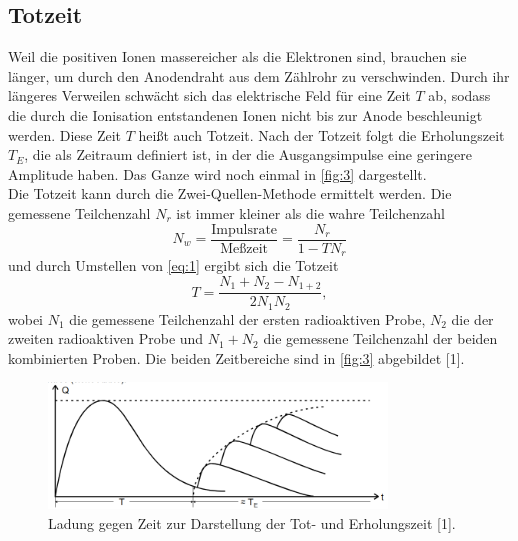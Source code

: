 \subsection{Totzeit}
Weil die positiven Ionen massereicher als die Elektronen sind, brauchen sie länger, um durch den Anodendraht aus dem Zählrohr zu verschwinden. Durch ihr längeres Verweilen schwächt sich das elektrische Feld für eine Zeit $T$ ab, sodass die durch die Ionisation entstandenen Ionen nicht bis zur Anode beschleunigt werden. Diese Zeit $T$ heißt auch Totzeit. Nach der Totzeit folgt die Erholungszeit $T_E$, die als Zeitraum definiert ist, in der die Ausgangsimpulse eine geringere Amplitude haben. Das Ganze wird noch einmal in \autoref{fig:3} dargestellt.\\
Die Totzeit kann durch die Zwei-Quellen-Methode ermittelt werden. Die gemessene Teilchenzahl $N_r$ ist immer kleiner als die wahre Teilchenzahl
\begin{equation}
  N_w=\frac{\textrm{Impulsrate}}{\textrm{Meßzeit}}=\frac{N_r}{1-TN_r}
  \label{eq:1}
\end{equation}
und durch Umstellen von \eqref{eq:1} ergibt sich die Totzeit
\begin{equation}
  T=\frac{N_1+N_2-N_{1+2}}{2N_{1}N_{2}},
  \label{eq:2}
\end{equation}
wobei $N_1$ die gemessene Teilchenzahl der ersten radioaktiven Probe, $N_2$ die der zweiten radioaktiven Probe und $N_1 + N_2$ die gemessene Teilchenzahl der beiden kombinierten Proben.
Die beiden Zeitbereiche sind in \autoref{fig:3} abgebildet [1].
\begin{figure}[H] 
  \centering 
  \includegraphics[width=9cm]{content/3.png} 
  \caption{Ladung gegen Zeit zur Darstellung der Tot- und Erholungszeit [1].} 
  \label{fig:3} 
\end{figure}




